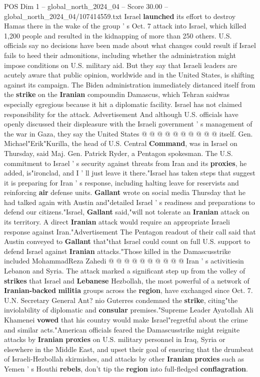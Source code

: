 \begin{textsample}{POS Dim 1 – global\_north\_2024\_04 – Score 30.00 – global\_north\_2024\_04/107414559.txt}
Israel \textbf{launched} its effort to destroy Hamas there in the wake of the group ' s Oct. 7 attack into Israel, which killed 1,200 people and resulted in the kidnapping of more than 250 others.
U.S. officials say no decisions have been made about what changes could result if Israel fails to heed their admonitions, including whether the administration might impose conditions on U.S. military aid.
But they say that Israeli leaders are acutely aware that public opinion, worldwide and in the United States, is shifting against its campaign.
The Biden administration immediately distanced itself from the \textbf{strike} on the \textbf{Iranian} compoundin Damascus, which Tehran saidwas especially egregious because it hit a diplomatic facility.
Israel has not claimed responsibility for the attack.
Advertisement And although U.S. officials have openly discussed their displeasure with the Israeli government ' s management of the war in Gaza, they say the United States @ @ @ @ @ @ @ @ @ @ itself.
Gen.
Michael"Erik"Kurilla, the head of U.S.
Central \textbf{Command}, was in Israel on Thursday, said Maj.
Gen.
Patrick Ryder, a Pentagon spokesman.
The U.S. commitment to Israel ' s security against threats from Iran and its \textbf{proxies}, he added, is"ironclad, and I ' ll just leave it there."Israel has taken steps that suggest it is preparing for Iran ' s response, including halting leave for reservists and reinforcing \textbf{air} defense units. \textbf{Gallant} wrote on social media Thursday that he had talked again with Austin and"detailed Israel ' s readiness and preparations to defend our citizens."Israel, \textbf{Gallant} said,"will not tolerate an \textbf{Iranian} attack on its territory.
A direct \textbf{Iranian} attack would require an appropriate Israeli response against Iran."Advertisement The Pentagon readout of their call said that Austin conveyed to \textbf{Gallant} that"that Israel could count on full U.S. support to defend Israel against \textbf{Iranian} attacks."Those killed in the Damascusstrike included MohammadReza Zahedi @ @ @ @ @ @ @ @ @ @ Iran ' s activitiesin Lebanon and Syria.
The attack marked a significant step up from the volley of \textbf{strikes} that Israel and \textbf{Lebanese} Hezbollah, the most powerful of a network of \textbf{Iranian-backed} \textbf{militia} groups across the \textbf{region}, have exchanged since Oct. 7.
U.N.
Secretary General Ant? nio Guterres condemned the \textbf{strike}, citing"the inviolability of diplomatic and \textbf{consular} premises."Supreme Leader Ayatollah Ali Khamenei \textbf{vowed} that his country would make Israel"regretful about the crime and similar acts."American officials feared the Damascusstrike might reignite attacks by \textbf{Iranian} \textbf{proxies} on U.S. military personnel in Iraq, Syria or elsewhere in the Middle East, and upset their goal of ensuring that the drumbeat of Israeli-Hezbollah skirmishes, and attacks by other \textbf{Iranian} \textbf{proxies} such as Yemen ' s Houthi \textbf{rebels}, don't tip the \textbf{region} into full-fledged \textbf{conflagration}.

\end{textsample}
